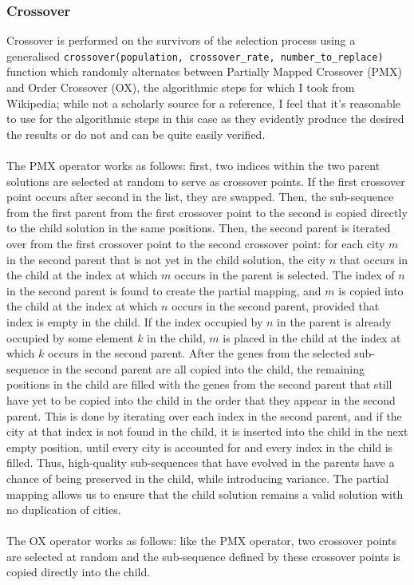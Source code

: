 \documentclass[a4paper]{article}
\begin{document}
\subsubsection{Crossover}
Crossover is performed on the survivors of the selection process using a generalised \texttt{crossover(population, crossover\_rate, number\_to\_replace)} function which randomly alternates between Partially Mapped Crossover (PMX) and Order Crossover (OX), the algorithmic steps for which I took from Wikipedia\supercite{crossover}; while not a scholarly source for a reference, I feel that it's reasonable to use for the algorithmic steps in this case as they evidently produce the desired the results or do not and can be quite easily verified.
\\\\
The PMX operator works as follows:
first, two indices within the two parent solutions are selected at random to serve as crossover points.
If the first crossover point occurs after second in the list, they are swapped.
Then, the sub-sequence from the first parent from the first crossover point to the second is copied directly to the child solution in the same positions.
Then, the second parent is iterated over from the first crossover point to the second crossover point:
for each city $m$ in the second parent that is not yet in the child solution, the city $n$ that occurs in the child at the index at which $m$ occurs in the parent is selected.
The index of $n$ in the second parent is found to create the partial mapping, and $m$ is copied into the child at the index at which $n$ occurs in the second parent, provided that index is empty in the child.
If the index occupied by $n$ in the parent is already occupied by some element $k$ in the child, $m$ is placed in the child at the index at which $k$ occurs in the second parent.
After the genes from the selected sub-sequence in the second parent are all copied into the child, the remaining positions in the child are filled with the genes from the second parent that still have yet to be copied into the child in the order that they appear in the second parent.
This is done by iterating over each index in the second parent, and if the city at that index is not found in the child, it is inserted into the child in the next empty position, until every city is accounted for and every index in the child is filled.
Thus, high-quality sub-sequences that have evolved in the parents have a chance of being preserved in the child, while introducing variance.
The partial mapping allows us to ensure that the child solution remains a valid solution with no duplication of cities.
\\\\
The OX operator works as follows:
like the PMX operator, two crossover points are selected at random and the sub-sequence defined by these crossover points is copied directly into the child.
\end{document}
